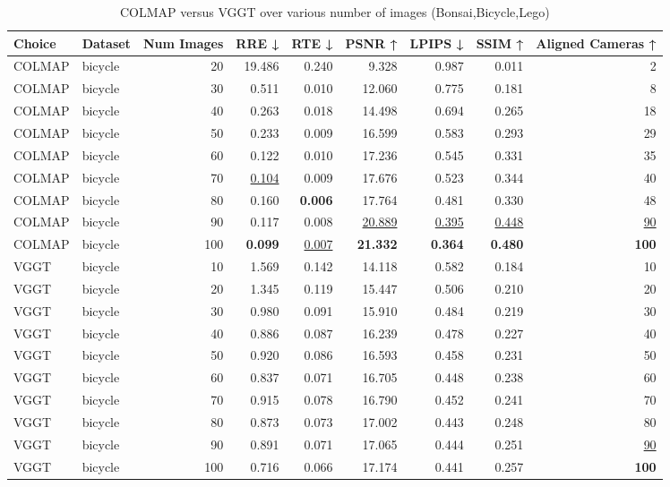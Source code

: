 \begin{table}[H]
\caption{COLMAP versus VGGT over various number of images (Bonsai,Bicycle,Lego)}
\label{tab:01_num_images_bonsai,bicycle,lego}
\small
\begin{tabular}{llrrrrrrr}
\toprule
Choice & Dataset & Num Images & RRE ↓ & RTE ↓ & PSNR ↑ & LPIPS ↓ & SSIM ↑ & Aligned Cameras ↑ \\
\midrule
COLMAP & bicycle & 20 & 19.486 & 0.240 & 9.328 & 0.987 & 0.011 & 2 \\
COLMAP & bicycle & 30 & 0.511 & 0.010 & 12.060 & 0.775 & 0.181 & 8 \\
COLMAP & bicycle & 40 & 0.263 & 0.018 & 14.498 & 0.694 & 0.265 & 18 \\
COLMAP & bicycle & 50 & 0.233 & 0.009 & 16.599 & 0.583 & 0.293 & 29 \\
COLMAP & bicycle & 60 & 0.122 & 0.010 & 17.236 & 0.545 & 0.331 & 35 \\
COLMAP & bicycle & 70 & \underline{0.104} & 0.009 & 17.676 & 0.523 & 0.344 & 40 \\
COLMAP & bicycle & 80 & 0.160 & \textbf{0.006} & 17.764 & 0.481 & 0.330 & 48 \\
COLMAP & bicycle & 90 & 0.117 & 0.008 & \underline{20.889} & \underline{0.395} & \underline{0.448} & \underline{90} \\
COLMAP & bicycle & 100 & \textbf{0.099} & \underline{0.007} & \textbf{21.332} & \textbf{0.364} & \textbf{0.480} & \textbf{100} \\
VGGT & bicycle & 10 & 1.569 & 0.142 & 14.118 & 0.582 & 0.184 & 10 \\
VGGT & bicycle & 20 & 1.345 & 0.119 & 15.447 & 0.506 & 0.210 & 20 \\
VGGT & bicycle & 30 & 0.980 & 0.091 & 15.910 & 0.484 & 0.219 & 30 \\
VGGT & bicycle & 40 & 0.886 & 0.087 & 16.239 & 0.478 & 0.227 & 40 \\
VGGT & bicycle & 50 & 0.920 & 0.086 & 16.593 & 0.458 & 0.231 & 50 \\
VGGT & bicycle & 60 & 0.837 & 0.071 & 16.705 & 0.448 & 0.238 & 60 \\
VGGT & bicycle & 70 & 0.915 & 0.078 & 16.790 & 0.452 & 0.241 & 70 \\
VGGT & bicycle & 80 & 0.873 & 0.073 & 17.002 & 0.443 & 0.248 & 80 \\
VGGT & bicycle & 90 & 0.891 & 0.071 & 17.065 & 0.444 & 0.251 & \underline{90} \\
VGGT & bicycle & 100 & 0.716 & 0.066 & 17.174 & 0.441 & 0.257 & \textbf{100} \\

\end{tabular}
\end{table}
